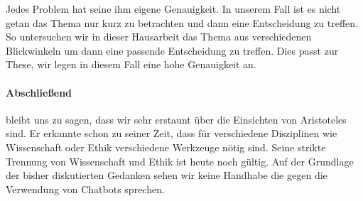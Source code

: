 \glqq Jedes Problem hat seine ihm eigene Genauigkeit\grqq. In unserem Fall ist es nicht getan das Thema nur kurz zu betrachten und dann eine Entscheidung zu treffen. So untersuchen wir in dieser Hausarbeit das Thema aus verschiedenen Blickwinkeln um dann eine passende Entscheidung zu treffen. Dies passt zur These, wir legen in diesem Fall eine hohe Genauigkeit an.

\paragraph{Abschließend} bleibt uns zu sagen, dass wir sehr erstaunt über die Einsichten von Aristoteles sind. Er erkannte schon zu seiner Zeit, dass für verschiedene Disziplinen wie Wissenschaft oder Ethik verschiedene Werkzeuge nötig sind. Seine strikte Trennung von Wissenschaft und Ethik ist heute noch gültig. Auf der Grundlage der bisher diskutierten Gedanken sehen wir keine Handhabe die gegen die Verwendung von Chatbots sprechen. 

